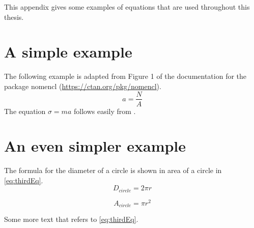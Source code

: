 This appendix gives some examples of equations that are used throughout this thesis.
\section{A simple example}
The following example is adapted from Figure 1 of the documentation for the package nomencl (\url{https://ctan.org/pkg/nomencl}).
\begin{equation}\label{eq:mainEq}
a=\frac{N}{A}
\end{equation}
%
The equation $\sigma = m a$%
%
follows easily from .

\section{An even simpler example}
The formula for the diameter of a circle is shown in  area of a circle in \cref{eq:thirdEq}.
\begin{equation}\label{eq:secondEq}
D_{circle}=2\pi r
\end{equation}
%
%

\begin{equation}\label{eq:thirdEq}
A_{circle}=\pi r^2
\end{equation}
%

Some more text that refers to \eqref{eq:thirdEq}.
\fi  %